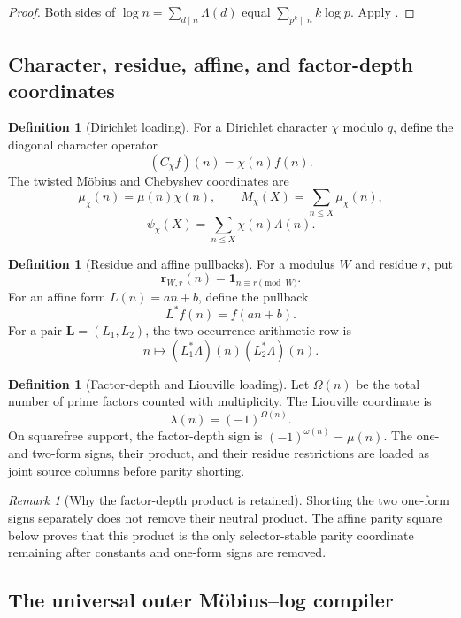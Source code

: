 \documentclass[11pt]{article}
\theoremstyle{definition}
\newtheorem{definition}[theorem]{Definition}
\theoremstyle{remark}
\newtheorem{remark}[theorem]{Remark}
\newcommand{\one}{\mathbf 1}
\begin{document}
\begin{proof}
Both sides of $\log n=\sum_{d\mid n}\Lambda(d)$ equal
$\sum_{p^k\parallel n}k\log p$.  Apply .
\end{proof}

\subsection{Character, residue, affine, and factor-depth coordinates}

\begin{definition}[Dirichlet loading]
For a Dirichlet character $\chi$ modulo $q$, define the diagonal character
operator
\[
 (C_\chi f)(n)=\chi(n)f(n).
\]
The twisted M\"obius and Chebyshev coordinates are
\[
 \mu_\chi(n)=\mu(n)\chi(n),
 \qquad
 M_\chi(X)=\sum_{n\le X}\mu_\chi(n),
\]
\[
 \psi_\chi(X)=\sum_{n\le X}\chi(n)\Lambda(n).
\]
\end{definition}

\begin{definition}[Residue and affine pullbacks]
For a modulus $W$ and residue $r$, put
\[
 \mathbf r_{W,r}(n)=\one_{n\equiv r\pmod W}.
\]
For an affine form $L(n)=an+b$, define the pullback
\[
 L^*f(n)=f(an+b).
\]
For a pair $\bm L=(L_1,L_2)$, the two-occurrence arithmetic row is
\[
 n\longmapsto (L_1^*\Lambda)(n)(L_2^*\Lambda)(n).
\]
\end{definition}

\begin{definition}[Factor-depth and Liouville loading]
Let $\Omega(n)$ be the total number of prime factors counted with
multiplicity.  The Liouville coordinate is
\[
 \lambda(n)=(-1)^{\Omega(n)}.
\]
On squarefree support, the factor-depth sign is $(-1)^{\omega(n)}=\mu(n)$.
The one- and two-form signs, their product, and their residue restrictions are
loaded as joint source columns before parity shorting.
\end{definition}

\begin{remark}[Why the factor-depth product is retained]
Shorting the two one-form signs separately does not remove their neutral
product.  The affine parity square below proves that this product is the only
selector-stable parity coordinate remaining after constants and one-form
signs are removed.
\end{remark}

\subsection{The universal outer M\"obius--log compiler}
\end{document}
